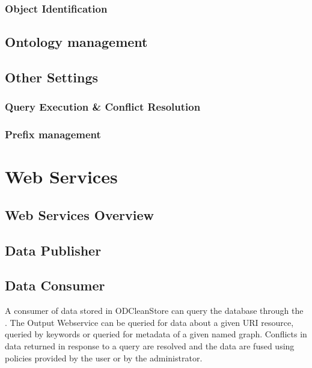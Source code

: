 \subsection*{Object Identification}

\section{Ontology management}
\label{sec:ontologyManagement}

\section{Other Settings}

\subsection{Query Execution \& Conflict Resolution}
\label{sec:QEnCR}

\subsection{Prefix management}
\label{sec:frontendPrefixMgmt}


\chapter{Web Services}

\section{Web Services Overview}

\section{Data Publisher}
\label{sec:inputWS}

\section{Data Consumer}
\label{sec:outputWS}

A consumer of data stored in ODCleanStore can query the database through the . The Output Webservice can be queried for data about a given URI resource, queried by keywords or queried for metadata of a given named graph. Conflicts in data returned in response to a query are resolved and the data are fused using policies provided by the user or by the administrator.

